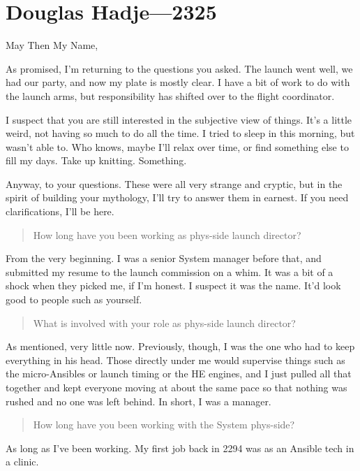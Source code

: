 \hypertarget{douglas-hadje-2325}{%
\chapter{Douglas Hadje---2325}\label{douglas-hadje-2325}}

May Then My Name,

As promised, I'm returning to the questions you asked. The launch went well, we had our party, and now my plate is mostly clear. I have a bit of work to do with the launch arms, but responsibility has shifted over to the flight coordinator.

I suspect that you are still interested in the subjective view of things. It's a little weird, not having so much to do all the time. I tried to sleep in this morning, but wasn't able to. Who knows, maybe I'll relax over time, or find something else to fill my days. Take up knitting. Something.

Anyway, to your questions. These were all very strange and cryptic, but in the spirit of building your mythology, I'll try to answer them in earnest. If you need clarifications, I'll be here.

\begin{quote}
How long have you been working as phys-side launch director?
\end{quote}

\noindent From the very beginning. I was a senior System manager before that, and submitted my resume to the launch commission on a whim. It was a bit of a shock when they picked me, if I'm honest. I suspect it was the name. It'd look good to people such as yourself.

\begin{quote}
What is involved with your role as phys-side launch director?
\end{quote}

\noindent As mentioned, very little now. Previously, though, I was the one who had to keep everything in his head. Those directly under me would supervise things such as the micro-Ansibles or launch timing or the HE engines, and I just pulled all that together and kept everyone moving at about the same pace so that nothing was rushed and no one was left behind. In short, I was a manager.

\begin{quote}
How long have you been working with the System phys-side?
\end{quote}

\noindent As long as I've been working. My first job back in 2294 was as an Ansible tech in a clinic.

